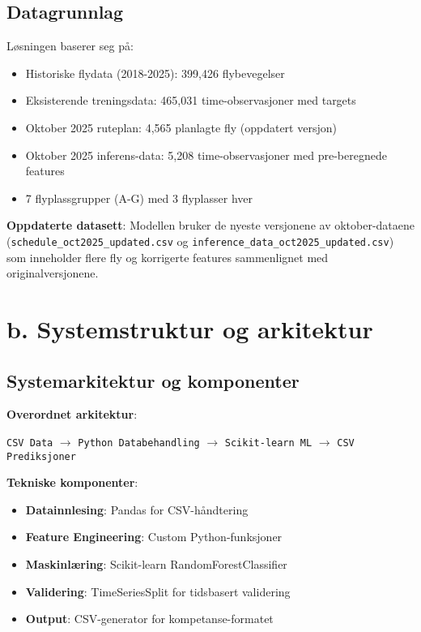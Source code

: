 \documentclass[11pt,a4paper]{article}
\begin{document}
\subsection{Datagrunnlag}
Løsningen baserer seg på:
\begin{itemize}
    \item Historiske flydata (2018-2025): 399,426 flybevegelser
    \item Eksisterende treningsdata: 465,031 time-observasjoner med targets
    \item Oktober 2025 ruteplan: 4,565 planlagte fly (oppdatert versjon)
    \item Oktober 2025 inferens-data: 5,208 time-observasjoner med pre-beregnede features
    \item 7 flyplassgrupper (A-G) med 3 flyplasser hver
\end{itemize}

\textbf{Oppdaterte datasett}: Modellen bruker de nyeste versjonene av oktober-dataene (\texttt{schedule\_oct2025\_updated.csv} og \texttt{inference\_data\_oct2025\_updated.csv}) som inneholder flere fly og korrigerte features sammenlignet med originalversjonene.

\section{b. Systemstruktur og arkitektur}

\subsection{Systemarkitektur og komponenter}

\textbf{Overordnet arkitektur}:
\begin{center}
\texttt{CSV Data} $\rightarrow$ \texttt{Python Databehandling} $\rightarrow$ \texttt{Scikit-learn ML} $\rightarrow$ \texttt{CSV Prediksjoner}
\end{center}

\textbf{Tekniske komponenter}:
\begin{itemize}
    \item \textbf{Datainnlesing}: Pandas for CSV-håndtering
    \item \textbf{Feature Engineering}: Custom Python-funksjoner
    \item \textbf{Maskinlæring}: Scikit-learn RandomForestClassifier
    \item \textbf{Validering}: TimeSeriesSplit for tidsbasert validering
    \item \textbf{Output}: CSV-generator for kompetanse-formatet
\end{itemize}
\end{document}
